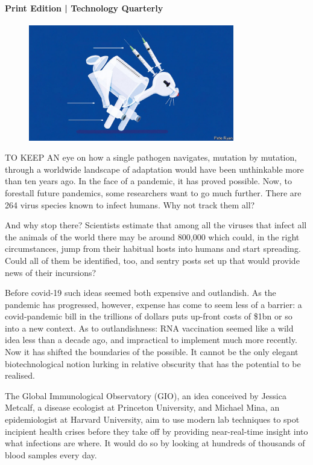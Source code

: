 \documentclass{article}
\begin{document}
\paragraph{Print Edition | Technology Quarterly  \quad \color{gray}{Mar 23rd 2021 }}
\begin{figure}[h]
\centering
\includegraphics[width=0.8\textwidth]{images/20210327_tqd006.jpg}
\end{figure}
\lettrine{T}O KEEP AN eye on how a single pathogen navigates, mutation by mutation, through a worldwide landscape of adaptation would have been unthinkable more than ten years ago. In the face of a pandemic, it has proved possible. Now, to forestall future pandemics, some researchers want to go much further. There are 264 virus species known to infect humans. Why not track them all? 

And why stop there? Scientists estimate that among all the viruses that infect all the animals of the world there may be around 800,000 which could, in the right circumstances, jump from their habitual hosts into humans and start spreading. Could all of them be identified, too, and sentry posts set up that would provide news of their incursions? 

Before covid-19 such ideas seemed both expensive and outlandish. As the pandemic has progressed, however, expense has come to seem less of a barrier: a covid-pandemic bill in the trillions of dollars puts up-front costs of \$1bn or so into a new context. As to outlandishness: RNA vaccination seemed like a wild idea less than a decade ago, and impractical to implement much more recently. Now it has shifted the boundaries of the possible. It cannot be the only elegant biotechnological notion lurking in relative obscurity that has the potential to be realised. 

The Global Immunological Observatory (GIO), an idea conceived by Jessica Metcalf, a disease ecologist at Princeton University, and Michael Mina, an epidemiologist at Harvard University, aim to use modern lab techniques to spot incipient health crises before they take off by providing near-real-time insight into what infections are where. It would do so by looking at hundreds of thousands of blood samples every day. 
\end{document}
